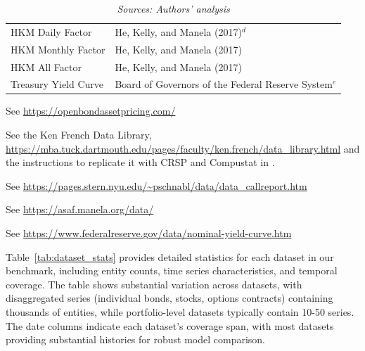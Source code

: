 \documentclass{article}
\newcommand{\floatsource}[1]{\caption*{\footnotesize\emph{#1}}}
\newcommand{\allsources}{Sources: Bloomberg, Board of Governors of the Federal Reserve System, Center for Research in Security Prices, Compustat, Call Reports, FINRA TRACE, OptionMetrics, S\&P Global, Open Source Bond Asset Pricing, He, Kelly, and Manela (2017), Authors' analysis}
\begin{document}
\begin{table}[htbp]
\begin{threeparttable}
\begin{tabular}{p{4cm}p{8cm}}
HKM Daily Factor & He, Kelly, and Manela (2017)$^{d}$\\
HKM Monthly Factor & He, Kelly, and Manela (2017) \\
HKM All Factor & He, Kelly, and Manela (2017) \\
Treasury Yield Curve & Board of Governors of the Federal Reserve System$^{e}$ \\
\bottomrule
\end{tabular}
\begin{tablenotes}
\footnotesize
\item[$^{a}$] See \url{https://openbondassetpricing.com/}
\item[$^{b}$] See the Ken French Data Library, \url{https://mba.tuck.dartmouth.edu/pages/faculty/ken.french/data_library.html} and the instructions to replicate it with CRSP and Compustat in \citet{Fama2023}.
\item[$^{c}$] See \url{https://pages.stern.nyu.edu/~pschnabl/data/data_callreport.htm}
\item[$^{d}$] See \url{https://asaf.manela.org/data/}
\item[$^{e}$] See \url{https://www.federalreserve.gov/data/nominal-yield-curve.htm}
\end{tablenotes}
\end{threeparttable}
\floatsource{Sources: Authors' analysis}
\end{table}

Table~\ref{tab:dataset_stats} provides detailed statistics for each dataset in our benchmark, including entity counts, time series characteristics, and temporal coverage. The table shows substantial variation across datasets, with disaggregated series (individual bonds, stocks, options contracts) containing thousands of entities, while portfolio-level datasets typically contain 10-50 series. The date columns indicate each dataset's coverage span, with most datasets providing substantial histories for robust model comparison.

\begin{table}[htbp]
\centering
\caption{Dataset Statistics Summary}
\label{tab:dataset_stats}

\vspace{0.1cm}
\floatsource{\allsources}
\end{table}

\end{document}
